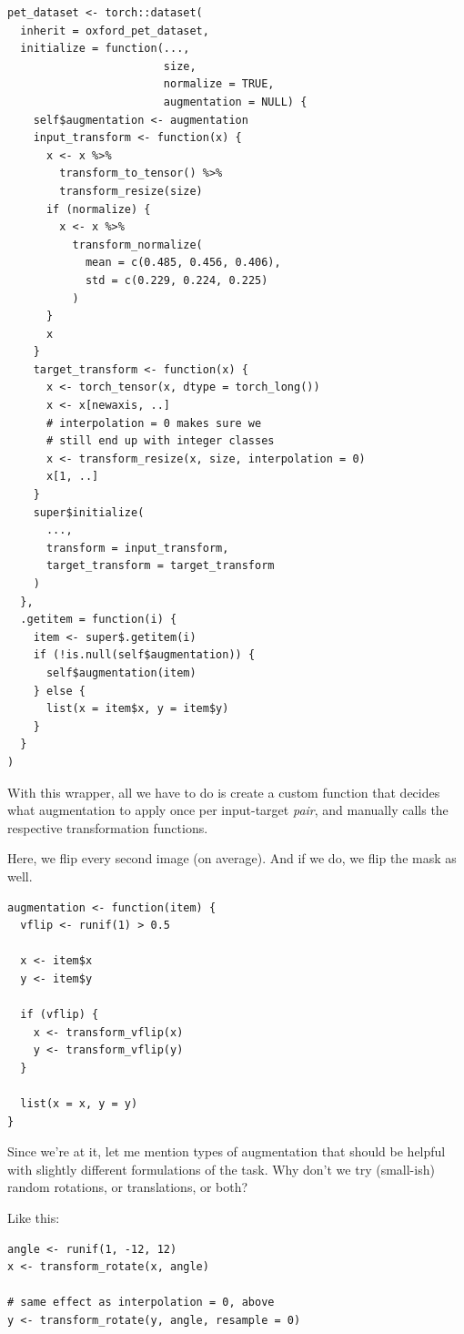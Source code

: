 \documentclass[
  letterpaper,
]{krantz}
\begin{document}
\begin{verbatim}
pet_dataset <- torch::dataset(
  inherit = oxford_pet_dataset,
  initialize = function(...,
                        size,
                        normalize = TRUE,
                        augmentation = NULL) {
    self$augmentation <- augmentation
    input_transform <- function(x) {
      x <- x %>%
        transform_to_tensor() %>%
        transform_resize(size)
      if (normalize) {
        x <- x %>%
          transform_normalize(
            mean = c(0.485, 0.456, 0.406),
            std = c(0.229, 0.224, 0.225)
          )
      }
      x
    }
    target_transform <- function(x) {
      x <- torch_tensor(x, dtype = torch_long())
      x <- x[newaxis, ..]
      # interpolation = 0 makes sure we
      # still end up with integer classes
      x <- transform_resize(x, size, interpolation = 0)
      x[1, ..]
    }
    super$initialize(
      ...,
      transform = input_transform,
      target_transform = target_transform
    )
  },
  .getitem = function(i) {
    item <- super$.getitem(i)
    if (!is.null(self$augmentation)) {
      self$augmentation(item)
    } else {
      list(x = item$x, y = item$y)
    }
  }
)
\end{verbatim}

With this wrapper, all we have to do is create a custom function that
decides what augmentation to apply once per input-target \emph{pair},
and manually calls the respective transformation functions.

Here, we flip every second image (on average). And if we do, we flip the
mask as well.

\begin{verbatim}
augmentation <- function(item) {
  vflip <- runif(1) > 0.5

  x <- item$x
  y <- item$y

  if (vflip) {
    x <- transform_vflip(x)
    y <- transform_vflip(y)
  }

  list(x = x, y = y)
}
\end{verbatim}

Since we're at it, let me mention types of augmentation that should be
helpful with slightly different formulations of the task. Why don't we
try (small-ish) random rotations, or translations, or both?

Like this:

\begin{verbatim}
angle <- runif(1, -12, 12)
x <- transform_rotate(x, angle)

# same effect as interpolation = 0, above
y <- transform_rotate(y, angle, resample = 0)
\end{verbatim}
\end{document}
